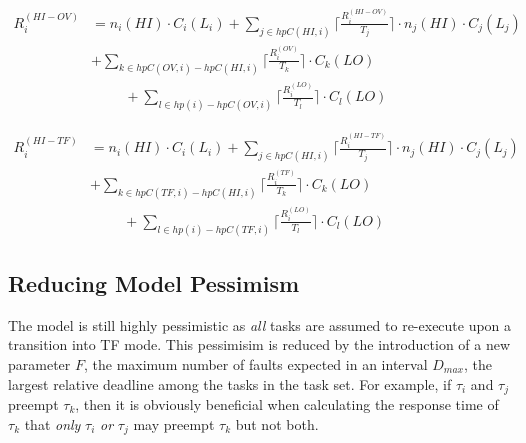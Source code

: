\begin{equation}\label{eq:hiovmode}
\begin{aligned}
R_i^{(HI-OV)} & = n_i(HI) \cdot C_i(L_i) 
  +\sum_{j \in hpC(HI,i)}\Big\lceil\frac{R_i^{(HI-OV)}}{T_j}\Big\rceil \cdot n_j(HI) \cdot C_j(L_j) \\
&  +\sum_{k \in hpC(OV,i)-hpC(HI,i)}\Big\lceil\frac{R_i^{(OV)}}{T_k}\Big\rceil \cdot C_k(LO) \\
& \hspace{1cm}  +\sum_{l \in hp(i)-hpC(OV,i)}\Big\lceil\frac{R_i^{(LO)}}{T_l}\Big\rceil \cdot C_l(LO)
\end{aligned}
\end{equation}

\begin{equation}\label{eq:hitfmode}
\begin{aligned}
R_i^{(HI-TF)} & = n_i(HI) \cdot C_i(L_i)
  +\sum_{j \in hpC(HI,i)}\Big\lceil\frac{R_i^{(HI-TF)}}{T_j}\Big\rceil \cdot n_j(HI) \cdot C_j(L_j) \\
&  +\sum_{k \in hpC(TF,i)-hpC(HI,i)}\Big\lceil\frac{R_i^{(TF)}}{T_k}\Big\rceil \cdot C_k(LO) \\
& \hspace{1cm}  +\sum_{l \in hp(i)-hpC(TF,i)}\Big\lceil\frac{R_i^{(LO)}}{T_l}\Big\rceil \cdot C_l(LO)
\end{aligned}
\end{equation}

\subsection{Reducing Model Pessimism}

	The model is still highly pessimistic as \emph{all} tasks are assumed to re-execute upon a transition into TF mode. 
	This pessimisim is reduced by the introduction of a new parameter $F$, the maximum number of faults expected in an interval $D_{max}$, the largest relative deadline among the tasks in the task set.
	For example, if $\tau_i$ and $\tau_j$ preempt $\tau_k$, then it is obviously beneficial when calculating the response time of $\tau_k$ that \emph{only} $\tau_i$ \emph{or} $\tau_j$ may preempt $\tau_k$ but not both.

